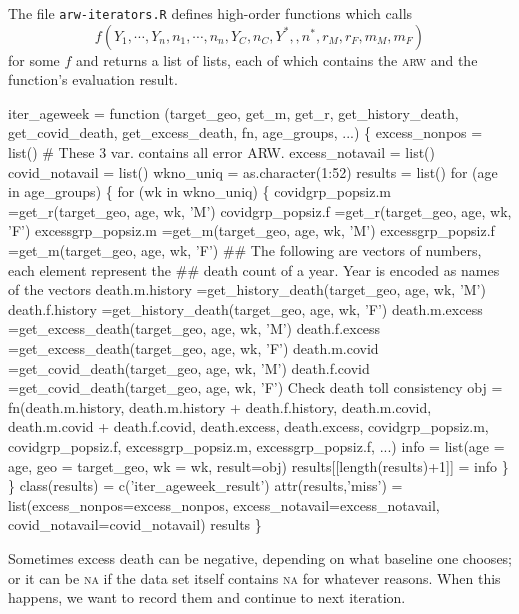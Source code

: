 \documentclass{article}
\begin{document}
The file {\tt{}arw-iterators.R} defines high-order functions which calls
\begin{equation}
f(Y_1,\cdots,Y_n,n_1,\cdots,n_n,Y_{C},n_C,Y^*,,n^*,r_M,r_F,m_M,m_F)
\end{equation}
for some $f$ and returns a list of lists, each of which contains the \textsc{arw} and the function's evaluation result.

\nwenddocs{}\endmoddef
iter_ageweek = function (target_geo, get_m, get_r,
                         get_history_death, get_covid_death, get_excess_death,
                         fn,
                         age_groups, ...) \{
  excess_nonpos   = list() # These 3 var. contains all error ARW.
  excess_notavail = list()
  covid_notavail  = list()
  wkno_uniq = as.character(1:52)
  results   = list()
  for (age in age_groups) \{
    for (wk in wkno_uniq) \{
      covidgrp_popsiz.m    =get_r(target_geo, age, wk, 'M')
      covidgrp_popsiz.f    =get_r(target_geo, age, wk, 'F')
      excessgrp_popsiz.m   =get_m(target_geo, age, wk, 'M')
      excessgrp_popsiz.f   =get_m(target_geo, age, wk, 'F')
      ## The following are vectors of numbers, each element represent the
      ## death count of a year. Year is encoded as names of the vectors
      death.m.history      =get_history_death(target_geo, age, wk, 'M')
      death.f.history      =get_history_death(target_geo, age, wk, 'F')
      death.m.excess       =get_excess_death(target_geo, age, wk, 'M')
      death.f.excess       =get_excess_death(target_geo, age, wk, 'F')
      death.m.covid        =get_covid_death(target_geo, age, wk, 'M')
      death.f.covid        =get_covid_death(target_geo, age, wk, 'F')
      \LA{}Check death toll consistency\RA{}
      obj = fn(death.m.history,   death.m.history + death.f.history,
               death.m.covid,     death.m.covid + death.f.covid,
               death.excess,      death.excess,
               covidgrp_popsiz.m, covidgrp_popsiz.f,
               excessgrp_popsiz.m, excessgrp_popsiz.f,
               ...)
      info = list(age = age, geo = target_geo, wk = wk, result=obj)
      results[[length(results)+1]] = info
    \}
  \}
  class(results) = c('iter_ageweek_result')
  attr(results,'miss') = list(excess_nonpos=excess_nonpos,
                              excess_notavail=excess_notavail,
                              covid_notavail=covid_notavail)
  results
\}
\nwendcode{}\nwdocspar

Sometimes excess death can be negative, depending on what baseline one chooses; or
it can be \textsc{na} if the data set itself contains \textsc{na} for whatever reasons. When this
happens, we want to record them and continue to next iteration.
\end{document}
